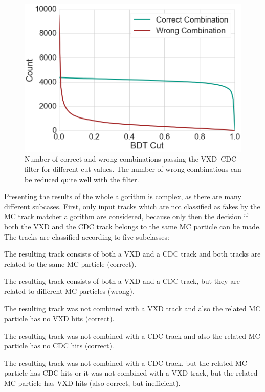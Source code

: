 \begin{figure}
  \centering
  \includegraphics[width=0.7\linewidth]{figures/workflow/vxd_cdc_merger_count.png}
  \caption{Number of correct and wrong combinations passing the VXD--CDC-filter for different cut values. The number of wrong combinations can be reduced quite well with the filter.}
  \label{fig-vxd-cdc-count}  
\end{figure}

Presenting the results of the whole algorithm is complex, as there are many different subcases. First, only input tracks which are not classified as fakes by the MC track matcher algorithm are considered, because only then the decision if both the VXD and the CDC track belongs to the same MC particle can be made. The tracks are classified according to five subclasses:
\begin{zlist}
  \item The resulting track consists of both a VXD and a CDC track and both tracks are related to the same MC particle (correct).
  \item The resulting track consists of both a VXD and a CDC track, but they are related to different MC particles (wrong).
  \item The resulting track was not combined with a VXD track and also the related MC particle has no VXD hits (correct).
  \item The resulting track was not combined with a CDC track and also the related MC particle has no CDC hits (correct).
  \item The resulting track was not combined with a CDC track, but the related MC particle has CDC hits or it was not combined with a VXD track, but the related MC particle has VXD hits (also correct, but inefficient).
\end{zlist}

